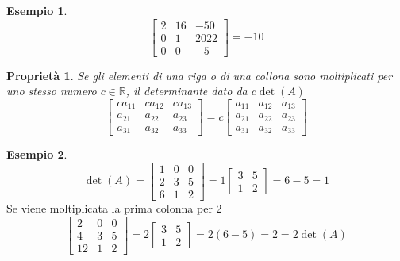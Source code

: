\documentclass{book}
\theoremstyle{definition}
\newtheorem{es}{Esempio}[section]
\theoremstyle{plain}
\newtheorem{pro}{Proprietà}[section]
\begin{document}
\begin{es}
  \label{es:prodeldet2}
  \begin{equation*}
    \begin{bmatrix}
      2 & 16 & -50\\
      0 & 1 & 2022\\
      0 & 0 & -5
    \end{bmatrix}=-10
  \end{equation*}
\end{es}
\begin{pro}
  \label{pro:prodeldet3}
  Se gli elementi di una riga o di una collona sono moltiplicati per uno
  stesso numero $c\in\mathds{R}$, il determinante dato da $c\det (A)$
  \begin{equation*}
    \begin{bmatrix}
      ca_{11}& ca_{12} & ca_{13}\\
      a_{21} & a_{22} & a_{23}\\
      a_{31} & a_{32} & a_{33}
    \end{bmatrix}=c
    \begin{bmatrix}
      a_{11} & a_{12} & a_{13}\\
      a_{21} & a_{22} & a_{23}\\
      a_{31} & a_{32} & a_{33}
    \end{bmatrix}
  \end{equation*}
\end{pro}
\begin{es}
  \label{es:prodeldet3}
  \begin{equation*}
    \det(A)=
    \begin{bmatrix}
      1 & 0 & 0\\
      2 & 3 & 5\\
      6 & 1 & 2
    \end{bmatrix}=1
    \begin{bmatrix}
      3 & 5\\
      1 & 2
    \end{bmatrix}=6-5=1
  \end{equation*}
  Se viene moltiplicata la prima colonna per 2
  \begin{equation*}
    \begin{bmatrix}
      2 & 0 & 0\\
      4 & 3 & 5\\
      12 & 1 & 2
    \end{bmatrix}=2
    \begin{bmatrix}
      3 & 5\\
      1 & 2
    \end{bmatrix}=2(6-5)=2 =2\det(A)
  \end{equation*}
\end{es}
\end{document}
